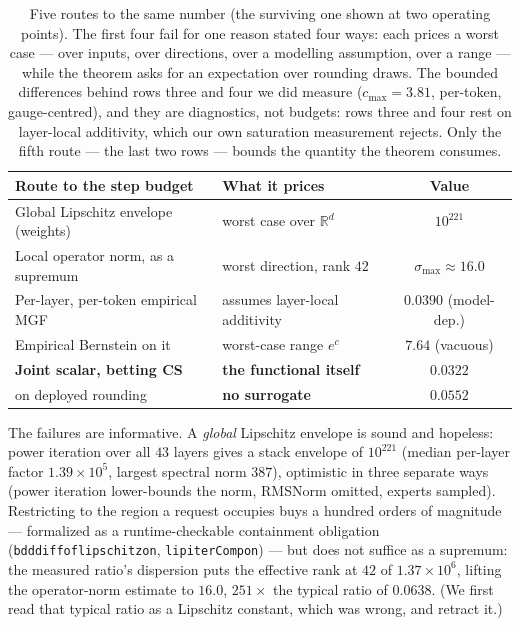\documentclass[11pt]{article}
\renewcommand{\_}{\WCorigunderscore\allowbreak}
\begin{document}
\begin{table}[htbp]\centering\small
\setlength{\tabcolsep}{3pt}\footnotesize
\begin{tabular}{@{}llc@{}}
\toprule
Route to the step budget & What it prices & Value\\
\midrule
Global Lipschitz envelope (weights) & worst case over $\mathbb{R}^d$ & $10^{221}$\\
Local operator norm, as a supremum & worst direction, rank $42$ & $\sigma_{\max}\!\approx\!16.0$\\
Per-layer, per-token empirical MGF & assumes layer-local additivity & $0.0390$ (model-dep.)\\
Empirical Bernstein on it & worst-case range $e^{c}$ & $7.64$ (vacuous)\\
\midrule
\textbf{Joint scalar, betting CS} & \textbf{the functional itself} &
$\mathbf{0.0322}$\\
\quad on deployed rounding & \textbf{no surrogate} & $\mathbf{0.0552}$\\
\bottomrule
\end{tabular}
\caption{Five routes to the same number (the surviving one shown at two
operating points). The first four fail for one reason stated four ways: each prices a worst case --- over inputs, over
directions, over a modelling assumption, over a range --- while the
theorem asks for an expectation over rounding draws. The bounded
differences behind rows three and four we did measure ($c_{\max}=3.81$,
per-token, gauge-centred), and they are diagnostics, not budgets: rows
three and four rest on layer-local additivity, which our own saturation
measurement rejects. Only the fifth route --- the last two rows ---
bounds the quantity the theorem consumes.}
\label{tab:ladder}
\end{table}

The failures are informative. A \emph{global} Lipschitz envelope is
sound and hopeless: power iteration over all $43$ layers gives a stack
envelope of $10^{221}$ (median per-layer factor $1.39\times10^{5}$,
largest spectral norm $387$),
optimistic in three separate ways (power iteration lower-bounds the
norm, RMSNorm omitted, experts sampled). Restricting to the region a
request occupies buys a hundred orders of magnitude --- formalized as a
runtime-checkable containment obligation
(\texttt{bdd\_diff\_of\_lipschitz\_on}, \texttt{lip\_iterComp\_on}) ---
but does not suffice as a supremum: the measured ratio's dispersion
puts the effective rank at $42$ of $1.37\times10^{6}$, lifting the
operator-norm estimate to $16.0$, $251\times$ the typical ratio of
$0.0638$. (We first read that typical ratio as a Lipschitz constant,
which was wrong, and retract it.)
\end{document}
